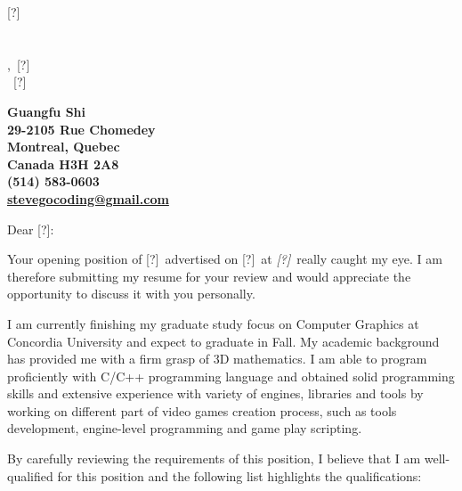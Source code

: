 \documentclass{letter}
\makeatletter
\newcommand{\placeholder}               {[?]}
\newcommand{\phcontactname}             {\placeholder}
\newcommand{\phcompanyname}             {\placeholder}
\newcommand{\phcompanyaddr}             {\placeholder}
\newcommand{\phcompanycity}             {\placeholder}
\newcommand{\phcompanyprov}             {\placeholder}
\newcommand{\phcompanynation}           {\placeholder}
\newcommand{\phcompanyzip}              {\placeholder}
\newcommand{\phjobpostedtitle}          {\placeholder}
\newcommand{\phjobposteddate}           {\placeholder}
\newcommand{\phjobpostedplace}          {\placeholder}
\newcommand{\clcontactname}         {\phcontactname}
\newcommand{\clcontactposition}     {\phcontactposition}
\newcommand{\clcompanyname}         {\phcompanyname}
\newcommand{\clcompanyaddr}         {\phcompanyaddr}
\newcommand{\clcompanycity}         {\phcompanycity}
\newcommand{\clcompanyprov}         {\phcompanyprov}
\newcommand{\clcompanynation}       {\phcompanynation}
\newcommand{\clcompanyzip}          {\phcompanyzip}
\newcommand{\cljobpostedtitle}      {\phjobpostedtitle}
\newcommand{\cljobposteddate}       {\phjobposteddate}
\newcommand{\cljobpostedplace}      {\phjobpostedplace}
\newcommand{\clmyname}              {Guangfu Shi}
\newcommand{\clmyaddr}              {29-2105 Rue Chomedey \\ Montreal, Quebec \\ Canada H3H 2A8}
\newcommand{\clmyemail}             {\href{mailto:stevegocoding@gmail.com}{stevegocoding@gmail.com}}
\newcommand{\clmyphone}             {(514) 583-0603}
\makeatother
\begin{document}
\signature{Guangfu Shi}             %
\longindentation=0pt                %
\let\raggedleft\raggedright         %


\begin{letter}{\clcontactname \\ \clcompanyname \\ \clcompanyaddr \\ \clcompanycity,\ \clcompanyprov \\ \clcompanynation\ \clcompanyzip}

\begin{center}
    \large\bf\clmyname              \\ 
    \clmyaddr                       \\
    \clmyphone                      \\ 
    \clmyemail                      
\end{center}

\vfill %

\opening{Dear \clcontactname:}

Your opening position of \cljobpostedtitle\ advertised on \cljobposteddate\ at \emph{\cljobpostedplace}\ really caught my eye. I am therefore submitting my resume for your review and would appreciate the opportunity to discuss it with you personally.

I am currently finishing my graduate study focus on Computer Graphics at Concordia University and expect to graduate in Fall. My academic background has provided me with a firm grasp of 3D mathematics. I am able to program proficiently with C/C++ programming language and obtained solid programming skills and extensive experience with variety of engines, libraries and tools by working on different part of video games creation process, such as tools development, engine-level programming and game play scripting.

By carefully reviewing the requirements of this position, I believe that I am well-qualified for this position and the following list highlights the qualifications:


\end{letter}
\end{document}
